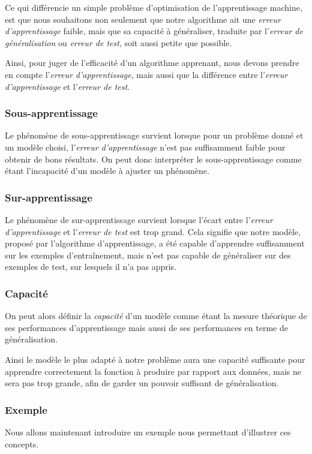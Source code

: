 \documentclass[a4paper, 11pt]{report}
\begin{document}
Ce qui différencie un simple problème d'optimisation de l'apprentissage machine, est que nous souhaitons non seulement que notre algorithme ait une \emph{erreur d’apprentissage} faible, mais que sa capacité à généraliser, traduite par l'\emph{erreur de généralisation} ou \emph{erreur de test}, soit aussi petite que possible.

Ainsi, pour juger de l'efficacité d'un algorithme apprenant, nous devons prendre en compte l'\emph{erreur d'apprentissage}, mais aussi que la différence entre l'\emph{erreur d'apprentissage} et l'\emph{erreur de test}.
\subsubsection{Sous-apprentissage}
Le phénomène de sous-apprentissage survient lorsque pour un problème donné et un modèle choisi, l'\emph{erreur d'apprentissage} n'est pas suffisamment faible pour obtenir de bons résultats.
On peut donc interpréter le sous-apprentissage comme étant l'incapacité d'un modèle à ajuster un phénomène.
\subsubsection{Sur-apprentissage}
Le phénomène de sur-apprentissage survient lorsque l'écart entre l'\emph{erreur d'apprentissage} et l'\emph{erreur de test} est trop grand. Cela signifie que notre modèle, proposé par l'algorithme d'apprentissage, a été capable d'apprendre suffisamment sur les exemples d'entraînement, mais n'est pas capable de généraliser sur des exemples de test, sur lesquels il n'a pas appris.
\subsubsection{Capacité}
On peut alors définir la \emph{capacité} d'un modèle comme étant la mesure théorique de ses performances d'apprentissage mais aussi de ses performances en terme de généralisation.

Ainsi le modèle le plus adapté à notre problème aura une capacité suffisante pour apprendre correctement la fonction à produire par rapport aux données, mais ne sera pas trop grande, afin de garder un pouvoir suffisant de généralisation.
			
\subsubsection{Exemple}
Nous allons maintenant introduire un exemple nous permettant d'illustrer ces concepts.
\end{document}
